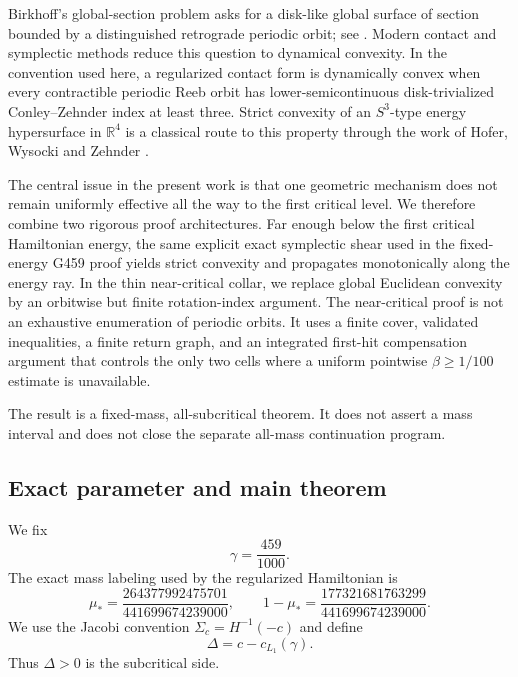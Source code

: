 \documentclass[11pt]{article}
\newcommand{\R}{\mathbb{R}}
\begin{document}
Birkhoff's global-section problem asks for a disk-like global surface of section bounded by a distinguished retrograde periodic orbit; see \citep{Birkhoff1915}. Modern contact and symplectic methods reduce this question to dynamical convexity. In the convention used here, a regularized contact form is dynamically convex when every contractible periodic Reeb orbit has lower-semicontinuous disk-trivialized Conley--Zehnder index at least three. Strict convexity of an $S^3$-type energy hypersurface in $\R^4$ is a classical route to this property through the work of Hofer, Wysocki and Zehnder \citep{HWZ1998}.

The central issue in the present work is that one geometric mechanism does not remain uniformly effective all the way to the first critical level. We therefore combine two rigorous proof architectures. Far enough below the first critical Hamiltonian energy, the same explicit exact symplectic shear used in the fixed-energy G459 proof yields strict convexity and propagates monotonically along the energy ray. In the thin near-critical collar, we replace global Euclidean convexity by an orbitwise but finite rotation-index argument. The near-critical proof is not an exhaustive enumeration of periodic orbits. It uses a finite cover, validated inequalities, a finite return graph, and an integrated first-hit compensation argument that controls the only two cells where a uniform pointwise $\beta\ge 1/100$ estimate is unavailable.

The result is a fixed-mass, all-subcritical theorem. It does not assert a mass interval and does not close the separate all-mass continuation program.

\subsection{Exact parameter and main theorem}
We fix
\[
\gamma=\frac{459}{1000}.
\]
The exact mass labeling used by the regularized Hamiltonian is
\[
\mu_* = \frac{264377992475701}{441699674239000},\qquad
1-\mu_* = \frac{177321681763299}{441699674239000}.
\]
We use the Jacobi convention $\Sigma_c=H^{-1}(-c)$ and define
\[
\Delta = c-c_{L_1}(\gamma).
\]
Thus $\Delta>0$ is the subcritical side.
\end{document}
